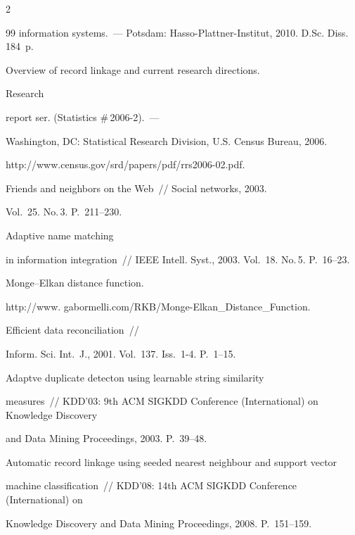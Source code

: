 \begin{multicols}{2}
{{\begin{thebibliography}{99}
information systems.~--- Potsdam: Hasso-Plattner-Institut, 2010. D.Sc. Diss. 184~p.






 Overview of record linkage and current research directions.

Research

report ser. (Statistics \#\,2006-2).~---

Washington, DC: Statistical Research Division, U.S. Census Bureau, 2006.

{\sf http://www.census.gov/srd/papers/pdf/rrs2006-02.pdf}.


 Friends and neighbors on the Web~// Social networks, 2003.

Vol.~25. No.\,3. P.~211--230.


 Adaptive name matching

in information integration~// IEEE Intell. Syst., 2003. Vol.~18. No.\,5. P.~16--23.


Monge--Elkan distance function.

{\sf http://www. gabormelli.com/RKB/Monge-Elkan\_Distance\_Function}.


 Efficient data reconciliation~//

Inform. Sci. Int.~J., 2001. Vol.~137. Iss.~1-4. P.~1--15.


 Adaptve duplicate detecton using learnable string similarity

measures~// KDD'03: 9th ACM SIGKDD  Conference (International) on Knowledge Discovery

and Data Mining Proceedings, 2003. P.~39--48.


 Automatic record linkage using seeded nearest neighbour and support vector

machine classification~// KDD'08:  14th ACM SIGKDD Conference (International) on

Knowledge Discovery and Data Mining  Proceedings, 2008. P.~151--159.


\end{thebibliography}}}
\end{multicols}
